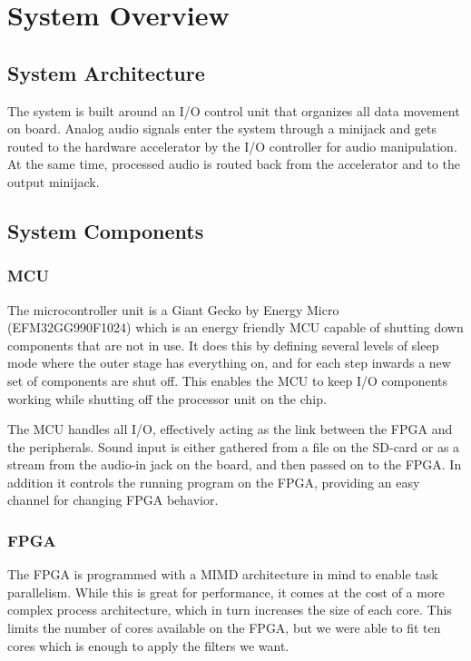 \section{System Overview}
\subsection{System Architecture}

The system is built around an I/O control unit that organizes all data movement
on board. Analog audio signals enter the system through a minijack and gets
routed to the hardware accelerator by the I/O controller for audio manipulation.
At the same time, processed audio is routed back from the accelerator and to the
output minijack.


\subsection{System Components}

\subsubsection{MCU} The microcontroller unit is a Giant Gecko by Energy Micro
(EFM32GG990F1024) which is an energy friendly MCU capable of shutting down
components that are not in use. It does this by defining several levels of sleep
mode where the outer stage has everything on, and for each step inwards a new
set of components are shut off. This enables the MCU to keep I/O components working while shutting off
the processor unit on the chip.

The MCU handles all I/O, effectively acting as the link between the FPGA and the
peripherals. Sound input is either gathered from a file on the SD-card or as a
stream from the audio-in jack on the board, and then passed on to the FPGA. In
addition it controls the running program on the FPGA, providing an easy channel
for changing FPGA behavior.

\subsubsection{FPGA} The FPGA is programmed with a MIMD architecture in mind to
enable task parallelism. While this is great for performance, it comes at the
cost of a more complex process architecture, which in turn increases the size of
each core. This limits the number of cores available on the FPGA, but we were
able to fit ten cores which is enough to apply
the filters we want.


